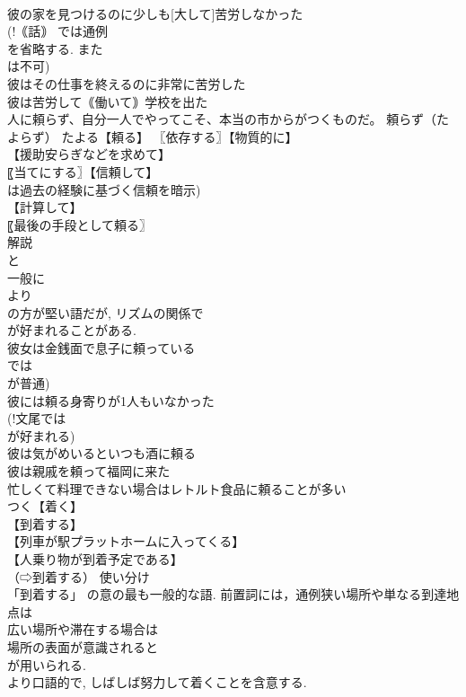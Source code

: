 \documentclass[8pt]{extreport}
\begin{document}
\begin{CJK}{UTF8}{min}
\\	彼の家を見つけるのに少しも[大して]苦労しなかった 
\\	(!｟話｠ では通例 
\\	を省略する. また 
\\	は不可) 
\\	彼はその仕事を終えるのに非常に苦労した 
\\	彼は苦労して｟働いて｠学校を出た 
\\	人に頼らず、自分一人でやってこそ、本当の市からがつくものだ。		頼らず（たよらず） たよる【頼る】 〖依存する〗【物質的に】
\\	【援助安らぎなどを求めて】
\\	〖当てにする〗【信頼して】
\\	は過去の経験に基づく信頼を暗示) 
\\	【計算して】
\\	〖最後の手段として頼る〗
\\	解説 
\\	と 
\\	一般に 
\\	より 
\\	の方が堅い語だが, リズムの関係で 
\\	が好まれることがある. 
\\	彼女は金銭面で息子に頼っている 
\\	では 
\\	が普通) 
\\	彼には頼る身寄りが1人もいなかった 
\\	(!文尾では 
\\	が好まれる) 
\\	彼は気がめいるといつも酒に頼る 
\\	彼は親戚を頼って福岡に来た 
\\	忙しくて料理できない場合はレトルト食品に頼ることが多い 
\\	つく【着く】 
\\	【到着する】 
\\	【列車が駅プラットホームに入ってくる】
\\	【人乗り物が到着予定である】
\\	（⇨到着する） 使い分け 
\\	「到着する」 の意の最も一般的な語. 前置詞には，通例狭い場所や単なる到達地点は 
\\	広い場所や滞在する場合は 
\\	場所の表面が意識されると 
\\	が用いられる. 
\\	より口語的で, しばしば努力して着くことを含意する. 

\end{CJK}
\end{document}
